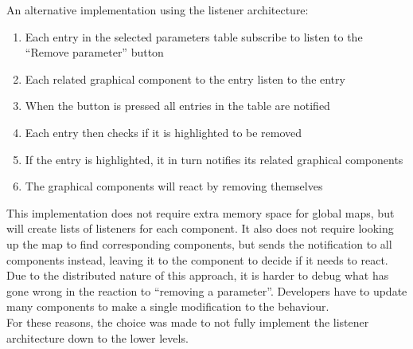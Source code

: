 An alternative implementation using the listener architecture:
\begin{enumerate}
\item Each entry in the selected parameters table subscribe to listen to the ``Remove parameter'' button
\item Each related graphical component to the entry listen to the entry
\item When the button is pressed all entries in the table are notified
\item Each entry then checks if it is highlighted to be removed
\item If the entry is highlighted, it in turn notifies its related graphical components
\item The graphical components will react by removing themselves
\end{enumerate}
This implementation does not require extra memory space for global maps, but will create lists of listeners for each component. It also does not require looking up the map to find corresponding components, but sends the notification to all components instead, leaving it to the component to decide if it needs to react. Due to the distributed nature of this approach, it is harder to debug what has gone wrong in the reaction to ``removing a parameter''. Developers have to update many components to make a single modification to the behaviour.\\
For these reasons, the choice was made to not fully implement the listener architecture down to the lower levels.

\newpage

